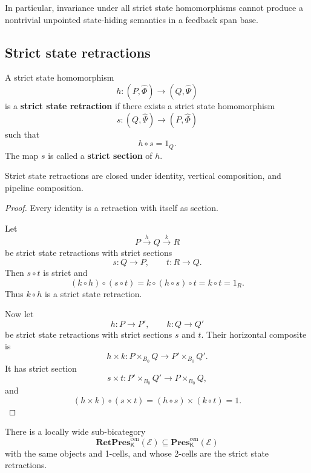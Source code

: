 In particular, invariance under all strict state homomorphisms cannot produce
a nontrivial unpointed state-hiding semantics in a feedback span base.

\subsection{Strict state retractions}
\label{subsec:strict-state-retractions}

\begin{definition}
\label{def:strict-state-retraction}
A strict state homomorphism
\[
    h:
    (P,\widehat\Phi)
    \longrightarrow
    (Q,\widehat\Psi)
\]
is a \textbf{strict state retraction} if there exists a strict state
homomorphism
\[
    s:
    (Q,\widehat\Psi)
    \longrightarrow
    (P,\widehat\Phi)
\]
such that
\[
    h\circ s=1_Q.
\]
The map \(s\) is called a \textbf{strict section} of \(h\).
\end{definition}

\begin{proposition}
\label{prop:closure-strict-state-retractions}
Strict state retractions are closed under identity, vertical composition, and
pipeline composition.
\end{proposition}

\begin{proof}
Every identity is a retraction with itself as section.

Let
\[
    P\xrightarrow{h}Q\xrightarrow{k}R
\]
be strict state retractions with strict sections
\[
    s:Q\to P,
    \qquad
    t:R\to Q.
\]
Then \(s\circ t\) is strict and
\[
    (k\circ h)\circ(s\circ t)
    =
    k\circ(h\circ s)\circ t
    =
    k\circ t
    =
    1_R.
\]
Thus \(k\circ h\) is a strict state retraction.

Now let
\[
    h:P\to P',
    \qquad
    k:Q\to Q'
\]
be strict state retractions with strict sections \(s\) and \(t\).
Their horizontal composite is
\[
    h\times k:
    P\times_{B_0}Q
    \longrightarrow
    P'\times_{B_0}Q'.
\]
It has strict section
\[
    s\times t:
    P'\times_{B_0}Q'
    \longrightarrow
    P\times_{B_0}Q,
\]
and
\[
    (h\times k)\circ(s\times t)
    =
    (h\circ s)\times(k\circ t)
    =
    1.
\]
\end{proof}

\begin{theorem}
\label{thm:retractive-presentation-bicategory}
There is a locally wide sub-bicategory
\[
    \mathbf{RetPres}^{\mathrm{cen}}_{\mathsf K}(\mathcal E)
    \subseteq
    \mathbf{Pres}^{\mathrm{cen}}_{\mathsf K}(\mathcal E)
\]
with the same objects and 1-cells, and whose 2-cells are the strict state
retractions.
\end{theorem}

